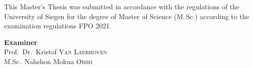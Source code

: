 \documentclass[12pt, a4paper, twoside, openright]{report}
\begin{document}



\newpage
\thispagestyle{empty}
\mbox{}
\newpage

\thispagestyle{empty}
\noindent This Master's Thesis was submitted in accordance with the regulations of the University of Siegen for the degree of Master of Science (M.\,Sc.) according to the examination regulations FPO 2021.

\vfill
\begin{flushleft}
\textbf{Examiner}\\[0.3cm]
Prof.\ Dr.\ Kristof \textsc{Van Laerhoven}\\
M.Sc.\ Nahshon Mokua \textsc{Obiri}
\end{flushleft}
\newpage

\thispagestyle{empty}
\mbox{}
\newpage




\thispagestyle{empty}
\mbox{}
\newpage

\tableofcontents\clearpage



\end{document}
